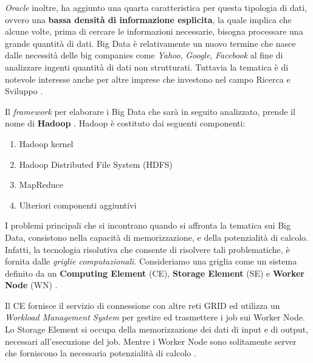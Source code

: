 \documentclass[11pt]{article}
\begin{document}
\emph{Oracle} inoltre, ha aggiunto una quarta caratteristica per questa tipologia di dati, ovvero una \textbf{bassa densità di informazione esplicita}, la quale implica che alcune volte, prima di cercare le informazioni necessarie, bisogna processare una grande quantità di dati. Big Data è relativamente un nuovo termine che nasce dalle necessità delle big companies come \emph{Yahoo}, \emph{Google}, \emph{Facebook} al fine di analizzare ingenti quantità di dati non strutturati. Tuttavia la tematica è di notevole interesse anche per altre imprese che investono nel campo Ricerca e Sviluppo \cite{6511732}. 

Il \emph{framework} per elaborare i Big Data che sarà in seguito analizzato, prende il nome di \textbf{Hadoop} \cite{hadoop}.
Hadoop è costituto dai seguenti componenti: 
\begin{enumerate}
	\item Hadoop kernel
	\item Hadoop Distributed File System (HDFS)
	\item MapReduce
	\item Ulteriori componenti aggiuntivi
\end{enumerate}
I problemi principali che si incontrano quando si affronta la tematica sui Big Data, consistono nella capacità di memorizzazione, e della potenzialità di calcolo. Infatti, la tecnologia risolutiva che consente di risolvere tali problematiche, è fornita dalle \emph{griglie computazionali}. Consideriamo una griglia come un sistema definito da un \textbf{Computing Element} (CE), \textbf{Storage Element} (SE) e \textbf{Worker Node} (WN) \cite{6511732}. 

Il CE fornisce il servizio di connessione con altre reti GRID ed utilizza un \emph{Workload Management System} per gestire ed trasmettere i job sui Worker Node. Lo Storage Element si occupa della memorizzazione dei dati di input e di output, necessari all'esecuzione del job. Mentre i Worker Node sono solitamente server che forniscono la necessaria potenzialità di calcolo \cite{6511732}.
\end{document}
